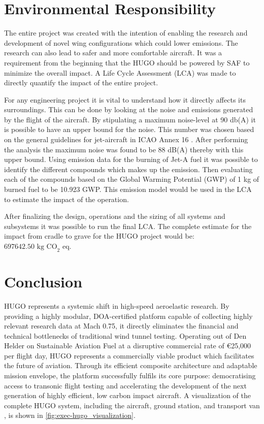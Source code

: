 \section*{Environmental Responsibility}
\label{sec:exec-environmental-responsibility}

The entire project was created with the intention of enabling the research and development of novel wing configurations which could lower emissions. The research can also lead to safer and more comfortable aircraft. It was a requirement from the beginning that the HUGO should be powered by SAF to minimize the overall impact. A Life Cycle Assessment (LCA) was made to directly quantify the impact of the entire project.   

For any engineering project it is vital to understand how it directly affects its surroundings. This can be done  by looking at the noise and emissions generated by the  flight of the aircraft. By stipulating a maximum noise-level at 90 db(A) it is possible to have an upper bound for the noise. This number was chosen based on the general guidelines for jet-aircraft in ICAO Annex 16 \cite{ICAO_Annex16}. After performing the analysis the maximum noise was found to be 88 dB(A) thereby with this upper bound. Using emission data for the burning of Jet-A fuel it was possible to identify the different compounds which makes up the emission. Then evaluating each of the compounds based on the Global Warming Potential (GWP) of 1 kg of burned fuel to be 10.923 GWP. This emission model would be used in the LCA to estimate the impact of the operation. 

After finalizing the design, operations and the sizing of all systems and subsystems it was possible to run the final LCA. The complete estimate for the impact from cradle to grave for the HUGO project would be: $697642.50 \text{ kg CO}_2\text{ eq}$. 



\section*{Conclusion}
\label{sec:exec-conclusion}

HUGO represents a systemic shift in high-speed aeroelastic research. By providing a highly modular, DOA-certified platform capable of collecting highly relevant research data at Mach 0.75, it directly eliminates the financial and technical bottlenecks of traditional wind tunnel testing. Operating out of Den Helder on Sustainable Aviation Fuel at a disruptive commercial rate of €25,000 per flight day, HUGO represents a commercially viable product which facilitates the future of aviation. Through its efficient composite architecture and adaptable mission envelope, the platform successfully fulfils its core purpose: democratising access to transonic flight testing and accelerating the development of the next generation of highly efficient, low carbon impact aircraft. A visualization of the complete HUGO system, including the aircraft, ground station, and transport van , is shown in \autoref{fig:exec-hugo_visualization}.

